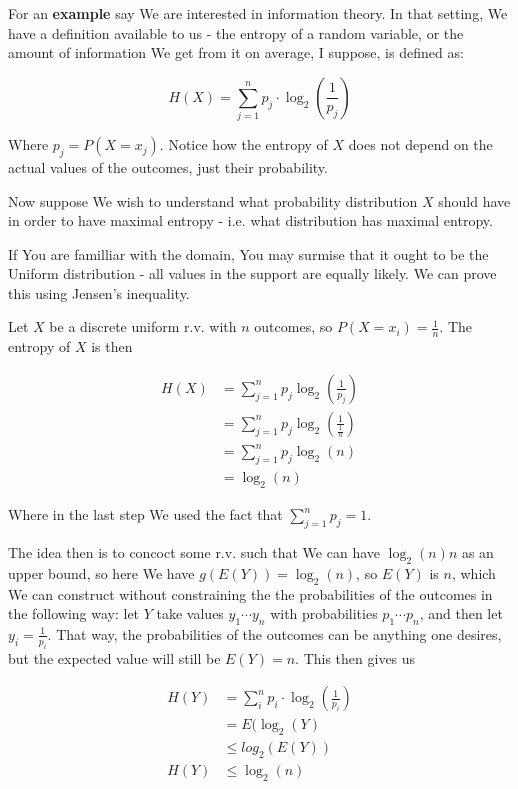 \documentclass{article}
\begin{document}
		For an \textbf{example} say We are interested in information theory. In that setting, We have a definition available to us - the entropy of a random variable, or the amount of information We get from it on average, I suppose, is defined as:
		
		\[ H(X) = \sum^n_{j=1} p_j\cdot \log_2\left(\frac{1}{p_j}\right) \]
		
		Where $p_j = P(X=x_j)$. Notice how the entropy of $X$ does not depend on the actual values of the outcomes, just their probability.
		
		Now suppose We wish to understand what probability distribution $X$ should have in order to have maximal entropy - i.e. what distribution has maximal entropy.
		
		If You are familliar with the domain, You may surmise that it ought to be the Uniform distribution - all values in the support are equally likely. We can prove this using Jensen's inequality.
		
		Let $X$ be a discrete uniform r.v. with $n$ outcomes, so $P(X=x_i) = \frac{1}{n}$. The entropy of $X$ is then
		
		\begin{align*}
		H(X) &= \sum^n_{j=1} p_j \log_2\left(\frac{1}{p_j}\right)\\
		&= \sum^n_{j=1} p_j \log_2\left(\frac{1}{\frac{1}{n}}\right)\\
		&= \sum^n_{j=1} p_j \log_2\left(n\right)\\
		&= \log_2(n)
		\end{align*}
		
		Where in the last step We used the fact that $\sum^n_{j=1} p_j = 1$.
			
		The idea then is to concoct some r.v. such that We can have $\log_2(n)n$ as an upper bound, so here We have $g(E(Y)) = \log_2(n)$, so $E(Y)$ is $n$, which We can construct without constraining the the probabilities of the outcomes in the following way: let $Y$ take values $y_1\cdots y_n$ with probabilities $p_1\cdots p_n$, and then let $y_i = \frac{1}{p_i}$. That way, the probabilities of the outcomes can be anything one desires, but the expected value will still be $E(Y)=n$. This then gives us
		
		\begin{align*}
		H(Y) &= \sum^n_i p_i\cdot \log_2\left(\frac{1}{p_i} \right)\\
		&= E(\log_2(Y)\\
		&\le log_2(E(Y))\\
		H(Y) &\le \log_2(n)
		\end{align*}
			
\end{document}
